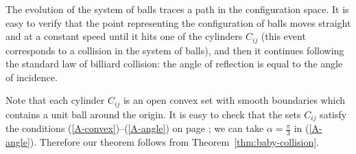 The evolution of the system
of balls traces a path in the configuration space. 
It is easy to verify that
the point representing the configuration of balls moves straight and at a
constant speed until it hits one of the cylinders $C_{ij}$ (this event corresponds
to a collision in the system of balls), and then it continues following the
standard law of billiard collision: 
the angle of reflection is equal to the angle
of incidence. 

Note that each cylinder $C_{ij}$ is an open convex set with smooth boundaries which contains a unit ball around the origin.
It is easy to check that the sets $C_{ij}$ satisfy the conditions (\ref{A-convex})--(\ref{A-angle}) on page \pageref{A-convex};
we can take $\alpha=\tfrac\pi3$ in (\ref{A-angle}).
Therefore our theorem follows 
from Theorem~\ref{thm:baby-collision}.
\qeds